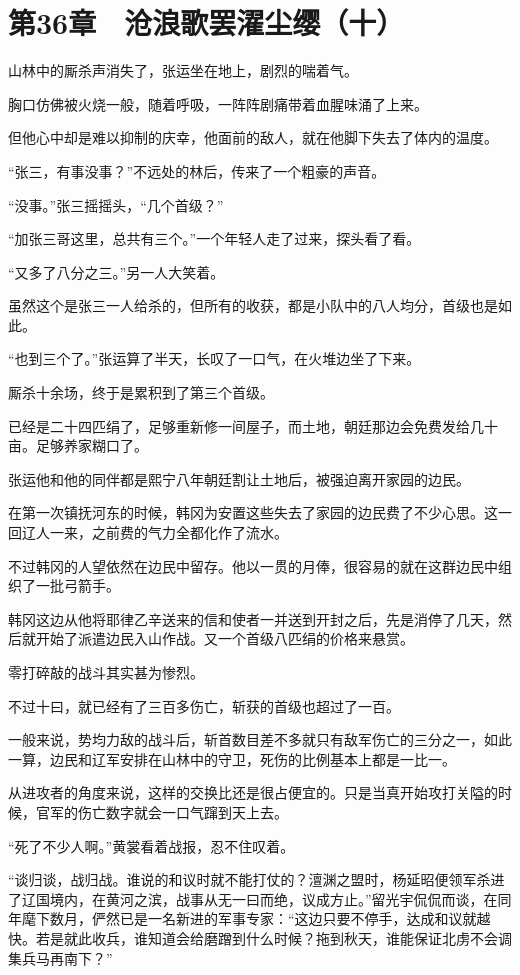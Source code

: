 \section{第36章　沧浪歌罢濯尘缨（十）}

山林中的厮杀声消失了，张运坐在地上，剧烈的喘着气。

胸口仿佛被火烧一般，随着呼吸，一阵阵剧痛带着血腥味涌了上来。

但他心中却是难以抑制的庆幸，他面前的敌人，就在他脚下失去了体内的温度。

“张三，有事没事？”不远处的林后，传来了一个粗豪的声音。

“没事。”张三摇摇头，“几个首级？”

“加张三哥这里，总共有三个。”一个年轻人走了过来，探头看了看。

“又多了八分之三。”另一人大笑着。

虽然这个是张三一人给杀的，但所有的收获，都是小队中的八人均分，首级也是如此。

“也到三个了。”张运算了半天，长叹了一口气，在火堆边坐了下来。

厮杀十余场，终于是累积到了第三个首级。

已经是二十四匹绢了，足够重新修一间屋子，而土地，朝廷那边会免费发给几十亩。足够养家糊口了。

张运他和他的同伴都是熙宁八年朝廷割让土地后，被强迫离开家园的边民。

在第一次镇抚河东的时候，韩冈为安置这些失去了家园的边民费了不少心思。这一回辽人一来，之前费的气力全都化作了流水。

不过韩冈的人望依然在边民中留存。他以一贯的月俸，很容易的就在这群边民中组织了一批弓箭手。

韩冈这边从他将耶律乙辛送来的信和使者一并送到开封之后，先是消停了几天，然后就开始了派遣边民入山作战。又一个首级八匹绢的价格来悬赏。

零打碎敲的战斗其实甚为惨烈。

不过十曰，就已经有了三百多伤亡，斩获的首级也超过了一百。

一般来说，势均力敌的战斗后，斩首数目差不多就只有敌军伤亡的三分之一，如此一算，边民和辽军安排在山林中的守卫，死伤的比例基本上都是一比一。

从进攻者的角度来说，这样的交换比还是很占便宜的。只是当真开始攻打关隘的时候，官军的伤亡数字就会一口气蹿到天上去。

“死了不少人啊。”黄裳看着战报，忍不住叹着。

“谈归谈，战归战。谁说的和议时就不能打仗的？澶渊之盟时，杨延昭便领军杀进了辽国境内，在黄河之滨，战事从无一曰而绝，议成方止。”留光宇侃侃而谈，在同年麾下数月，俨然已是一名新进的军事专家：“这边只要不停手，达成和议就越快。若是就此收兵，谁知道会给磨蹭到什么时候？拖到秋天，谁能保证北虏不会调集兵马再南下？”

